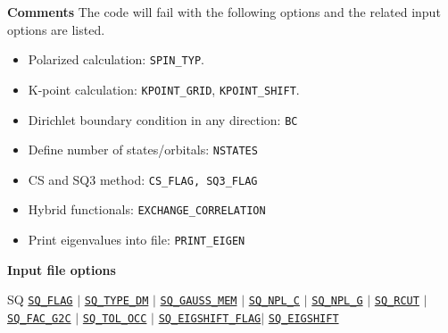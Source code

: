 
\begin{frame}[allowframebreaks]{\textbf{Comments}} \label{Introduction}
The code will fail with the following options and the related input options are listed.
\begin{itemize}
  \item Polarized calculation: \texttt{SPIN\_TYP}.
  \item K-point calculation: \texttt{KPOINT\_GRID}, \texttt{KPOINT\_SHIFT}.
  \item Dirichlet boundary condition in any direction: \texttt{BC}
  \item Define number of states/orbitals: \texttt{NSTATES}
  \item CS and SQ3 method: \texttt{CS\_FLAG, SQ3\_FLAG}
  \item Hybrid functionals: \texttt{EXCHANGE\_CORRELATION}
  \item Print eigenvalues into file: \texttt{PRINT\_EIGEN}
\end{itemize}

\end{frame}

\begin{frame}[allowframebreaks]{\textbf{Input file options}} \label{Index}
\vspace{-2mm}
\begin{block}{SQ}
\hyperlink{SQ_FLAG}{\texttt{SQ\_FLAG}} $\vert$ \hyperlink{SQ_TYPE_DM}{\texttt{SQ\_TYPE\_DM}} $\vert$ \hyperlink{SQ_GAUSS_MEM}{\texttt{SQ\_GAUSS\_MEM}} $\vert$ \hyperlink{SQ_NPL_C}{\texttt{SQ\_NPL\_C}}  $\vert$ \hyperlink{SQ_NPL_G}{\texttt{SQ\_NPL\_G}}  $\vert$ \hyperlink{SQ_RCUT}{\texttt{SQ\_RCUT}} $\vert$ \hyperlink{SQ_FAC_G2C}{\texttt{SQ\_FAC\_G2C}} $\vert$ \hyperlink{SQ_TOL_OCC}{\texttt{SQ\_TOL\_OCC}} $\vert$ \hyperlink{SQ_EIGSHIFT_FLAG}{\texttt{SQ\_EIGSHIFT\_FLAG}}$\vert$ \hyperlink{SQ_EIGSHIFT}{\texttt{SQ\_EIGSHIFT}} 
\end{block}

\end{frame}
